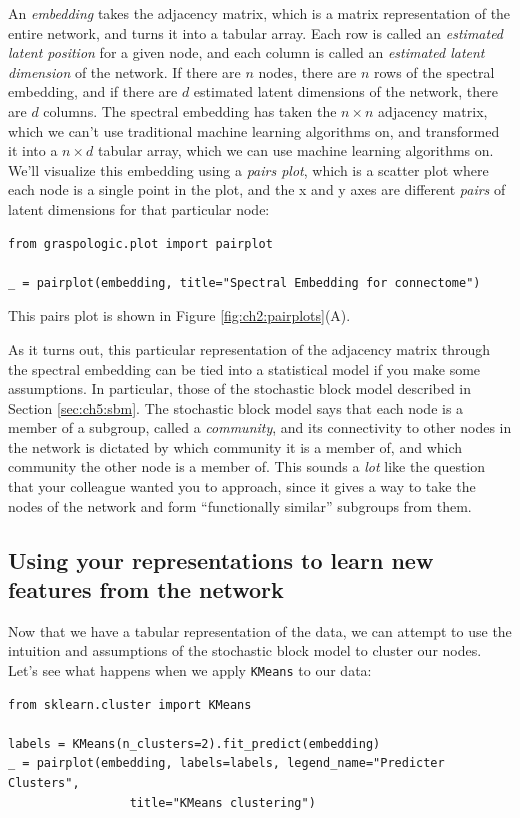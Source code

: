 An \emph{embedding} takes the adjacency matrix, which is a matrix representation of the entire network, and turns it into a tabular array. Each row is called an \emph{estimated latent position} for a given node, and each column is called an \emph{estimated latent dimension} of the network. If there are $n$ nodes, there are $n$ rows of the spectral embedding, and if there are $d$ estimated latent dimensions of the network, there are $d$ columns. The spectral embedding has taken the $n \times n$ adjacency matrix, which we can't use traditional machine learning algorithms on, and transformed it into a $n \times d$ tabular array, which we can use machine learning algorithms on. We'll visualize this embedding using a \emph{pairs plot}, which is a scatter plot where each node is a single point in the plot, and the x and y axes are different \emph{pairs} of latent dimensions for that particular node:

\begin{lstlisting}[style=python]
from graspologic.plot import pairplot

_ = pairplot(embedding, title="Spectral Embedding for connectome")
\end{lstlisting}
This pairs plot is shown in Figure \ref{fig:ch2:pairplots}(A).

As it turns out, this particular representation of the adjacency matrix through the spectral embedding can be tied into a statistical model if you make some assumptions. In particular, those of the stochastic block model described in Section \ref{sec:ch5:sbm}. The stochastic block model says that each node is a member of a subgroup, called a \emph{community}, and its connectivity to other nodes in the network is dictated by which community it is a member of, and which community the other node is a member of. This sounds a \emph{lot} like the question that your colleague wanted you to approach, since it gives a way to take the nodes of the network and form ``functionally similar'' subgroups from them. 

\subsection{Using your representations to learn new features from the network}

Now that we have a tabular representation of the data, we can attempt to use the intuition and assumptions of the stochastic block model to cluster our nodes. Let's see what happens when we apply \texttt{KMeans} to our data:
\begin{lstlisting}[style=python]
from sklearn.cluster import KMeans

labels = KMeans(n_clusters=2).fit_predict(embedding)
_ = pairplot(embedding, labels=labels, legend_name="Predicter Clusters", 
                 title="KMeans clustering")
\end{lstlisting}

